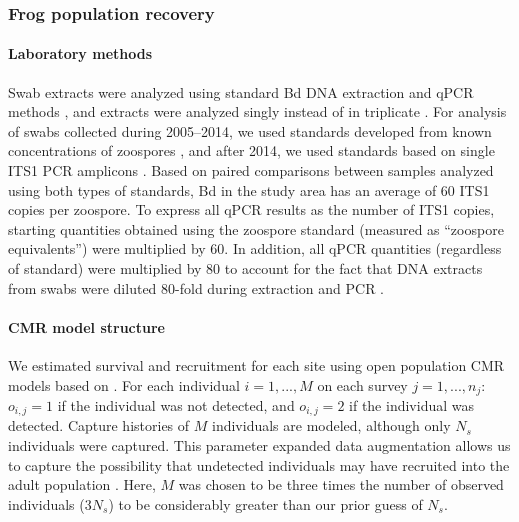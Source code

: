 \documentclass[
  letterpaper,
  DIV=11,
  numbers=noendperiod]{scrartcl}
\let\oldparagraph\paragraph
\renewcommand{\paragraph}[1]{\oldparagraph{#1}\mbox{}}
\begin{document}
\hypertarget{frog-population-recovery-2}{%
\subsubsection{Frog population
recovery}\label{frog-population-recovery-2}}

\hypertarget{laboratory-methods}{%
\paragraph{Laboratory methods}\label{laboratory-methods}}

Swab extracts were analyzed using standard Bd DNA extraction and qPCR
methods \citep{boyle2004}, and extracts were analyzed singly instead of
in triplicate \citep{kriger2006}. For analysis of swabs collected during
2005--2014, we used standards developed from known concentrations of
zoospores \citep{boyle2004}, and after 2014, we used standards based on
single ITS1 PCR amplicons \citep{longo2013}. Based on paired comparisons
between samples analyzed using both types of standards, Bd in the study
area has an average of 60 ITS1 copies per zoospore. To express all qPCR
results as the number of ITS1 copies, starting quantities obtained using
the zoospore standard (measured as ``zoospore equivalents'') were
multiplied by 60. In addition, all qPCR quantities (regardless of
standard) were multiplied by 80 to account for the fact that DNA
extracts from swabs were diluted 80-fold during extraction and PCR
\citep{vredenburg2010}.

\hypertarget{cmr-model-structure}{%
\paragraph{CMR model structure}\label{cmr-model-structure}}

We estimated survival and recruitment for each site using open
population CMR models based on \citet{joseph2018}. For each individual
\(i=1, ..., M\) on each survey \(j=1, ..., n_j\): \(o_{i, j} = 1\) if
the individual was not detected, and \(o_{i, j}=2\) if the individual
was detected. Capture histories of \(M\) individuals are modeled,
although only \(N_s\) individuals were captured. This parameter expanded
data augmentation allows us to capture the possibility that undetected
individuals may have recruited into the adult population
\citep{royle2012}. Here, \(M\) was chosen to be three times the number
of observed individuals (\(3N_s\)) to be considerably greater than our
prior guess of \(N_s\).
\end{document}
